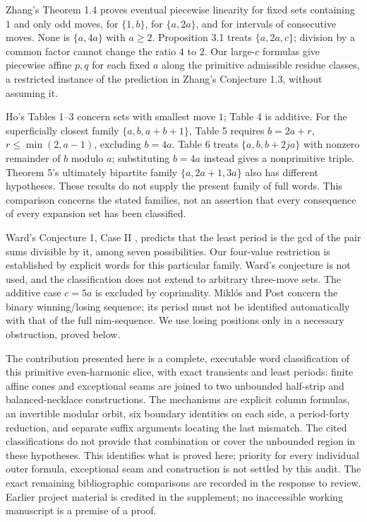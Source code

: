 \documentclass[11pt]{article}
\theoremstyle{remark}\newtheorem{remark}[theorem]{Remark}
\begin{document}
Zhang's Theorem 1.4 \cite{Zhang} proves eventual piecewise linearity for
fixed sets containing $1$ and only odd moves, for $\{1,b\}$,
for $\{a,2a\}$, and for intervals of consecutive moves.
None is $\{a,4a\}$ with $a\ge2$. Proposition 3.1 treats
$\{a,2a,c\}$; division by a common factor cannot change the ratio
$4$ to $2$. Our large-$c$ formulas give piecewise affine $p,q$ for
each fixed $a$ along the primitive admissible residue classes, a restricted
instance of the prediction in Zhang's Conjecture 1.3, without assuming it.

Ho's Tables 1--3 concern sets with smallest move $1$; Table 4 is additive.
For the superficially closest family $\{a,b,a+b+1\}$, Table 5 requires
$b=2a+r$, $r\le\min(2,a-1)$, excluding $b=4a$.
Table 6 treats $\{a,b,b+2ja\}$ with nonzero remainder of $b$ modulo $a$;
substituting $b=4a$ instead gives a nonprimitive triple.
Theorem 5's ultimately bipartite family $\{a,2a+1,3a\}$ also has
different hypotheses. These results do not supply the present family of
full words. This comparison concerns the stated families, not an assertion
that every consequence of every expansion set has been classified.

Ward's Conjecture 1, Case II \cite{Ward}, predicts that the least period
is the gcd of the pair sums divisible by it, among seven possibilities.
Our four-value restriction is established by explicit words for this
particular family. Ward's conjecture is not used, and the classification
does not extend to arbitrary three-move sets. The additive case $c=5a$
is excluded by coprimality. Mikl\'os and Post \cite{MP} concern the binary
winning/losing sequence; its period must not be identified automatically
with that of the full nim-sequence. We use losing positions only in a
necessary obstruction, proved below.

The contribution presented here is a complete, executable word
classification of this primitive even-harmonic slice, with exact transients
and least periods: finite affine cones and exceptional seams are joined to
two unbounded half-strip and balanced-necklace constructions. The mechanisms
are explicit column formulas, an invertible modular orbit, six boundary
identities on each side, a period-forty reduction, and separate suffix
arguments locating the last mismatch. The cited classifications do not
provide that combination or cover the unbounded region in these hypotheses.
This identifies what is proved here; priority for every individual outer
formula, exceptional seam and construction is not settled by this audit.
The exact remaining bibliographic comparisons are recorded in the
response to review. Earlier project material is credited in the supplement;
no inaccessible working manuscript is a premise of a proof.
\end{document}
